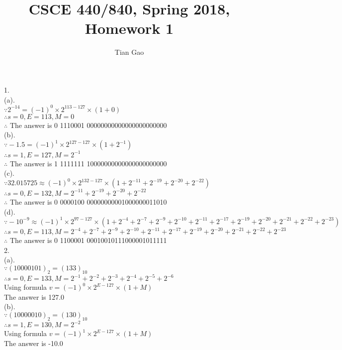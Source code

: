 \documentclass[a4paper]{article}
\title{CSCE 440/840, Spring 2018, Homework 1}
\author{Tian Gao}
\begin{document}
\maketitle


1.\\
(a).\\
$\because 2^{-14} = (-1)^0 \times 2^{113 - 127} \times (1 + 0)$\\
$\therefore s = 0, E = 113, M = 0$\\
$\therefore$ The answer is 0 1110001 00000000000000000000000\\

(b).\\
$\because -1.5 = (-1)^1 \times 2^{127 - 127} \times (1 + 2^{-1})$\\
$\therefore s = 1, E = 127, M = 2^{-1}$\\
$\therefore$ The answer is 1 1111111 10000000000000000000000\\

(c).\\
$\because 32.015725 \approx (-1)^0 \times 2^{132 - 127} \times (1 + 2^{-11} + 2^{-19} + 2^{-20} + 2^{-22})$\\
$\therefore s = 0, E = 132, M = 2^{-11} + 2^{-19} + 2^{-20} + 2^{-22}$\\
$\therefore$ The answer is 0 0000100 00000000001000000011010\\

(d).\\
$\because -10^{-9} \approx (-1)^1 \times 2^{97 - 127} \times (1 + 2^{-4} + 2^{-7} + 2^{-9} + 2^{-10} + 2^{-11} + 2^{-17} + 2^{-19} + 2^{-20} + 2^{-21} + 2^{-22} + 2^{-23})$\\
$\therefore s = 0, E = 113, M = 2^{-4} + 2^{-7} + 2^{-9} + 2^{-10} + 2^{-11} + 2^{-17} + 2^{-19} + 2^{-20} + 2^{-21} + 2^{-22} + 2^{-23}$\\
$\therefore$ The answer is 0 1100001 00010010111000001011111\\

2.\\
(a).\\
$\because (10000101)_2 = (133)_{10}$\\
$\therefore s = 0, E = 133, M = 2^{-1} + 2^{-2} + 2^{-3} + 2^{-4} + 2^{-5} + 2^{-6}$\\
Using formula $v = (-1)^0 \times 2^{E - 127} \times (1 + M) $\\
The answer is 127.0\\

(b).\\
$\because (10000010)_2 = (130)_{10}$\\
$\therefore s = 1, E = 130, M = 2^{-2}$\\
Using formula $v = (-1)^1 \times 2^{E - 127} \times (1 + M) $\\
The answer is -10.0\\
\end{document}
